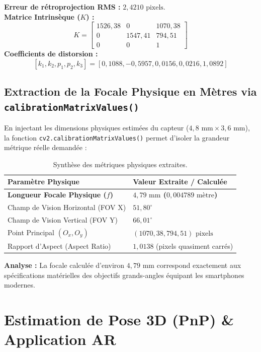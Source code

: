 \documentclass[11pt,a4paper]{article}
\begin{document}
\begin{tcolorbox}[title=Résultats d'Étalonnage Globaux]
\textbf{Erreur de rétroprojection RMS :} $2{,}4210\text{ pixels}$.\\[0.2cm]
\textbf{Matrice Intrinsèque ($K$) :}
\[
K = \begin{bmatrix} 1526{,}38 & 0 & 1070{,}38 \\ 0 & 1547{,}41 & 794{,}51 \\ 0 & 0 & 1 \end{bmatrix}
\]
\textbf{Coefficients de distorsion :}
\[
[k_1, k_2, p_1, p_2, k_3] = [0{,}1088, -0{,}5957, 0{,}0156, 0{,}0216, 1{,}0892]
\]
\end{tcolorbox}

\subsection{Extraction de la Focale Physique en Mètres via \texttt{calibrationMatrixValues()}}
En injectant les dimensions physiques estimées du capteur ($4{,}8\text{ mm} \times 3{,}6\text{ mm}$), la fonction \texttt{cv2.calibrationMatrixValues()} permet d'isoler la grandeur métrique réelle demandée :

\begin{table}[ht!]
\centering
\caption{Synthèse des métriques physiques extraites.}
\vspace{0.2cm}
\begin{tabular}{ll}
\toprule
\textbf{Paramètre Physique} & \textbf{Valeur Extraite / Calculée} \\
\midrule
\textbf{Longueur Focale Physique ($f$)} & \textbf{$4{,}79\text{ mm}$ ($0{,}004789\text{ mètre}$)} \\
Champ de Vision Horizontal (FOV X) & $51{,}80^\circ$ \\
Champ de Vision Vertical (FOV Y) & $66{,}01^\circ$ \\
Point Principal $(O_x, O_y)$ & $(1070{,}38, 794{,}51)\text{ pixels}$ \\
Rapport d'Aspect (Aspect Ratio) & $1{,}0138$ (pixels quasiment carrés) \\
\bottomrule
\end{tabular}
\end{table}

\noindent \textbf{Analyse :} La focale calculée d'environ $4{,}79\text{ mm}$ correspond exactement aux spécifications matérielles des objectifs grands-angles équipant les smartphones modernes.

\section{Estimation de Pose 3D (PnP) \& Application AR}
\end{document}

